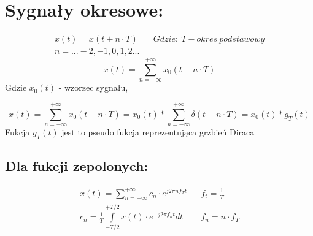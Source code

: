 \section{Sygnały okresowe:}
    \begin{align*}
        x(t) = x(t+n\cdot T) && Gdzie:\ T- okres\ podstawowy\\
        n = ...-2, -1, 0, 1, 2...
    \end{align*}
    \begin{equation*}
        x(t) = \sum_{n = -\infty}^{+\infty}x_0(t-n\cdot T)
    \end{equation*}
    Gdzie $x_0(t)$ - wzorzec sygnału,

    \begin{equation*}
        x(t) = \sum_{n=-\infty}^{+\infty}x_0(t-n\cdot T) = x_0(t) * \sum_{n=-\infty}^{+\infty}\delta(t-n\cdot T) = x_0(t)*g_T(t)
    \end{equation*}
    Fukcja $g_T(t)$ jest to pseudo fukcja reprezentująca grzbień Diraca

    \subsection*{Dla fukcji zepolonych:}
        \begin{align*}
            x(t) = \sum_{n=-\infty}^{+\infty} c_n \cdot e^{j2\pi n f_T t} && f_t = \frac{1}{T}\\
            c_n = \frac{1}{T} \int\limits_{-T/2}^{+T/2} x(t)\cdot e^{-j2\pi f_nt}dt && f_n = n\cdot f_T
        \end{align*}